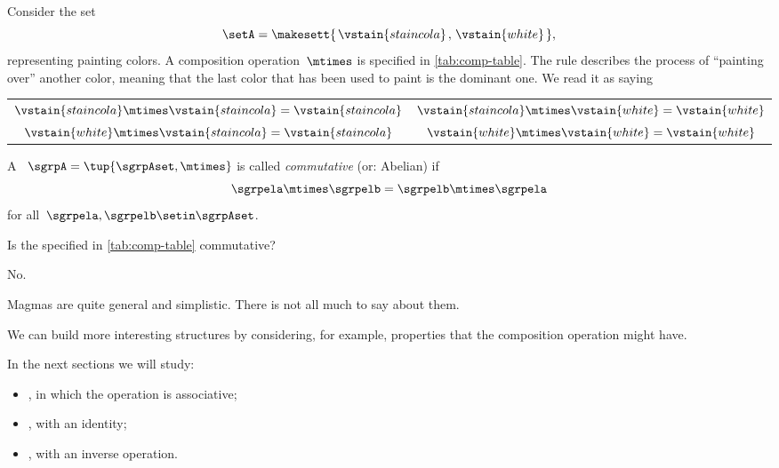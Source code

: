 \begin{example}
    Consider the set
    \begin{equation}
        \setA = \makesett{\hspace{0.05cm} \vstain{staincola}\hspace{0.05cm},\hspace{0.05cm} \vstain{white}\hspace{0.05cm}},
    \end{equation}
    representing painting colors.
    A composition operation~$\mtimes$ is specified in \cref{tab:comp-table}.
    The rule describes the process of ``painting over'' another color, meaning that the last color that has been used to paint is the dominant one.
    We read it as saying
    \begin{center}
        \setlength{\tabcolsep}{20pt}
        \begin{tabular}{cc}
            $\vstain{staincola} \mtimes \vstain{staincola} = \vstain{staincola}$ & $\vstain{staincola} \mtimes \vstain{white} = \vstain{white}$ \\
            $\vstain{white} \mtimes \vstain{staincola}     = \vstain{staincola}$ & $\vstain{white} \mtimes \vstain{white} = \vstain{white}$
        \end{tabular}
    \end{center}
\end{example}

\begin{definition}
    \label{def:magma-commutativity}
    A ~$\sgrpA = \tup{\sgrpAset, \mtimes}$ is called \emph{commutative} (or: Abelian) if
    \begin{equation}
        \label{eq:semigroup-commutativity}
        \sgrpela \mtimes   \sgrpelb = \sgrpelb \mtimes \sgrpela
    \end{equation}
    for all~$\sgrpela, \sgrpelb \setin \sgrpAset$.
\end{definition}

\begin{exercise}
    Is the  specified in \cref{tab:comp-table} commutative?
\end{exercise}
\begin{solution}
    No.
\end{solution}

Magmas are quite general and simplistic.
There is not all much to say about them.

We can build more interesting structures by considering, for example, properties that the composition operation might have.

In the next sections we will study:

\begin{itemize}
    \item \emph{},  in which the operation is associative;
    \item \emph{},  with an identity;
    \item \emph{},  with an inverse operation.
\end{itemize}

